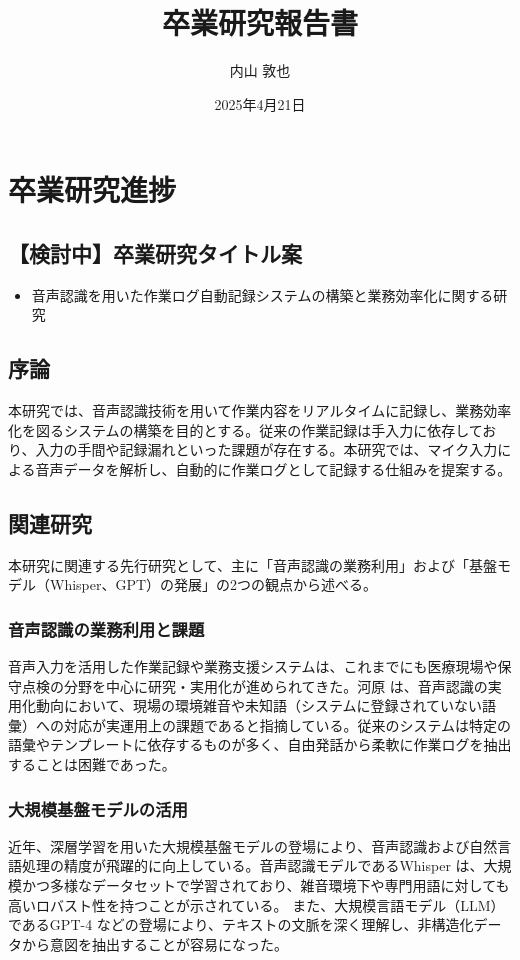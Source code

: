 \documentclass[a4paper,12pt,ja=standard,lualatex]{bxjsarticle}
\title{卒業研究報告書}
\author{内山 敦也}
\date{2025年4月21日}
\begin{document}
\maketitle

\section{卒業研究進捗}

\subsection{【検討中】卒業研究タイトル案}
\begin{itemize}
    \item 音声認識を用いた作業ログ自動記録システムの構築と業務効率化に関する研究
\end{itemize}

\subsection{序論}

本研究では、音声認識技術を用いて作業内容をリアルタイムに記録し、業務効率化を図るシステムの構築を目的とする。従来の作業記録は手入力に依存しており、入力の手間や記録漏れといった課題が存在する。本研究では、マイク入力による音声データを解析し、自動的に作業ログとして記録する仕組みを提案する。

\subsection{関連研究}
本研究に関連する先行研究として、主に「音声認識の業務利用」および「基盤モデル（Whisper、GPT）の発展」の2つの観点から述べる。

\subsubsection*{音声認識の業務利用と課題}
音声入力を活用した作業記録や業務支援システムは、これまでにも医療現場や保守点検の分野を中心に研究・実用化が進められてきた。河原 \cite{kawahara2016} は、音声認識の実用化動向において、現場の環境雑音や未知語（システムに登録されていない語彙）への対応が実運用上の課題であると指摘している。従来のシステムは特定の語彙やテンプレートに依存するものが多く、自由発話から柔軟に作業ログを抽出することは困難であった。

\subsubsection*{大規模基盤モデルの活用}
近年、深層学習を用いた大規模基盤モデルの登場により、音声認識および自然言語処理の精度が飛躍的に向上している。音声認識モデルであるWhisper \cite{radford2023whisper} は、大規模かつ多様なデータセットで学習されており、雑音環境下や専門用語に対しても高いロバスト性を持つことが示されている。
また、大規模言語モデル（LLM）であるGPT-4 \cite{openai2023gpt4} などの登場により、テキストの文脈を深く理解し、非構造化データから意図を抽出することが容易になった。
\end{document}

